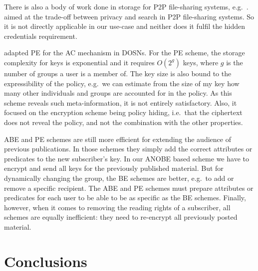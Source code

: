 There is also a body of work done in storage for \ac{P2P} file-sharing systems, 
e.g.\ \cite{TunableACinP2P}.
\citet{TunableACinP2P} aimed at the trade-off between privacy and search in 
\ac{P2P} file-sharing systems.
So it is not directly applicable in our use-case and neither does it fulfil the 
hidden credentials requirement.


\citet{PEAC} adapted \ac{PE} for the \ac{AC} mechanism in \acp{DOSN}.
For the \ac{PE} scheme, the storage complexity for keys is exponential and it 
requires \(O(2^g)\) keys, where \(g\) is the number of groups a user is 
a member of.
The key size is also bound to the expressibility of the policy, e.g.\ we can 
estimate from the size of my key how many other individuals and groups are 
accounted for in the policy.
As this scheme reveals such meta-information, it is not entirely satisfactory.
Also, it focused on the encryption scheme being policy hiding, i.e.\ that the 
ciphertext does not reveal the policy, and not the combination with the other 
properties.

\Ac{ABE} and \ac{PE} schemes are still more efficient for extending the 
audience of previous publications.
In those schemes they simply add the correct attributes or predicates to the 
new subscriber's key.
In our \ac{ANOBE} based scheme we have to encrypt and send all keys for the 
previously published material.
But for dynamically changing the group, the \ac{BE} schemes are better, e.g.\ 
to add or remove a specific recipient.
The \ac{ABE} and \ac{PE} schemes must prepare attributes or predicates for each 
user to be able to be as specific as the \ac{BE} schemes.
Finally, however, when it comes to removing the reading rights of a subscriber, 
all schemes are equally inefficient: they need to re-encrypt all previously 
posted material.


\section{Conclusions}\label{sec:Conclusions}

